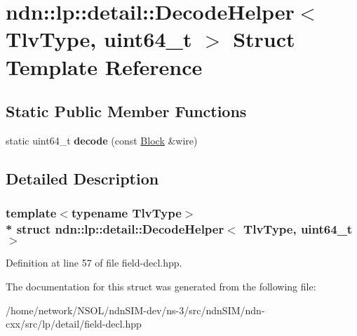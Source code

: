 \hypertarget{structndn_1_1lp_1_1detail_1_1DecodeHelper_3_01TlvType_00_01uint64__t_01_4}{}\section{ndn\+:\+:lp\+:\+:detail\+:\+:Decode\+Helper$<$ Tlv\+Type, uint64\+\_\+t $>$ Struct Template Reference}
\label{structndn_1_1lp_1_1detail_1_1DecodeHelper_3_01TlvType_00_01uint64__t_01_4}
\subsection*{Static Public Member Functions}
\begin{DoxyCompactItemize}
\item 
static uint64\+\_\+t {\bfseries decode} (const \hyperlink{classndn_1_1Block}{Block} \&wire)\hypertarget{structndn_1_1lp_1_1detail_1_1DecodeHelper_3_01TlvType_00_01uint64__t_01_4_a03f1f04d59efbeb3d4effd8107d4c36f}{}\label{structndn_1_1lp_1_1detail_1_1DecodeHelper_3_01TlvType_00_01uint64__t_01_4_a03f1f04d59efbeb3d4effd8107d4c36f}

\end{DoxyCompactItemize}


\subsection{Detailed Description}
\subsubsection*{template$<$typename Tlv\+Type$>$\\*
struct ndn\+::lp\+::detail\+::\+Decode\+Helper$<$ Tlv\+Type, uint64\+\_\+t $>$}



Definition at line 57 of file field-\/decl.\+hpp.



The documentation for this struct was generated from the following file\+:\begin{DoxyCompactItemize}
\item 
/home/network/\+N\+S\+O\+L/ndn\+S\+I\+M-\/dev/ns-\/3/src/ndn\+S\+I\+M/ndn-\/cxx/src/lp/detail/field-\/decl.\+hpp\end{DoxyCompactItemize}
